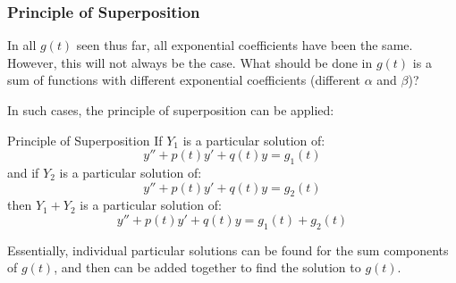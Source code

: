 \documentclass[12pt]{article}
\begin{document}
\subsubsection{Principle of Superposition}
\label{sssec:principleOfSuperpositionAnsatz}

In all $g(t)$ seen thus far, all exponential coefficients have been the same. However, this will not always be the case. What should be done in $g(t)$ is a sum of functions with different exponential coefficients (different $\alpha$ and $\beta$)?

In such cases, the principle of superposition can be applied:
\begin{definition}{Principle of Superposition}
  If $Y_1$ is a particular solution of:
  \begin{equation*}
    y'' + p(t)y' + q(t)y = g_1(t)
  \end{equation*}
  and if $Y_2$ is a particular solution of:
  \begin{equation*}
    y'' + p(t)y' + q(t)y = g_2(t)
  \end{equation*}
  then $Y_1 + Y_2$ is a particular solution of:
  \begin{equation*}
    y'' + p(t)y' + q(t)y = g_1(t) + g_2(t)
  \end{equation*}
\end{definition}
Essentially, individual particular solutions can be found for the sum components of $g(t)$, and then can be added together to find the solution to $g(t)$.
\end{document}
